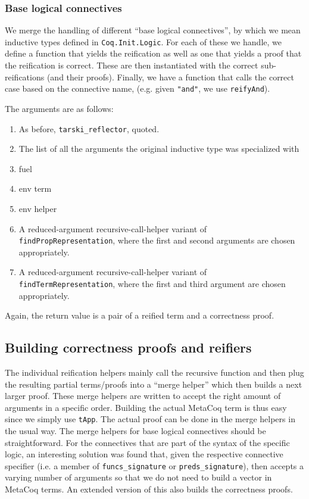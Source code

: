 \documentclass[11pt,a4paper]{article}
\begin{document}
\subsubsection{Base logical connectives}
We merge the handling of different \enquote{base logical connectives}, by which we mean inductive types defined in \lstinline|Coq.Init.Logic|. For each of these we handle, we define a function that yields the reification as well as one that yields a proof that the reification is correct. These are then instantiated with the correct sub-reifications (and their proofs). Finally, we have a function that calls the correct case based on the connective name, (e.g. given \lstinline|"and"|, we use \lstinline|reifyAnd|).

The arguments are as follows:
\begin{enumerate}
	\item As before, \lstinline|tarski_reflector|, quoted.
	\item The list of all the arguments the original inductive type was specialized with
	\item fuel
	\item env term
	\item env helper
	\item A reduced-argument recursive-call-helper variant of \lstinline|findPropRepresentation|, where the first and second arguments are chosen appropriately.
	\item A reduced-argument recursive-call-helper variant of \lstinline|findTermRepresentation|, where the first and third argument are chosen appropriately.
\end{enumerate}
Again, the return value is a pair of a reified term and a correctness proof.
\subsection{Building correctness proofs and reifiers}
The individual reification helpers mainly call the recursive function and then plug the resulting partial terms/proofs into a \enquote{merge helper} which then builds a next larger proof. These merge helpers are written to accept the right amount of arguments in a specific order. Building the actual MetaCoq term is thus easy since we simply use \lstinline|tApp|. The actual proof can be done in the merge helpers in the usual way. The merge helpers for base logical connectives should be straightforward. For the connectives that are part of the syntax of the specific logic, an interesting solution was found that, given the respective connective specifier (i.e. a member of \lstinline|funcs_signature| or \lstinline|preds_signature|), then accepts a varying number of arguments so that we do not need to build a vector in MetaCoq terms. An extended version of this also builds the correctness proofs.
\newpage
\end{document}
